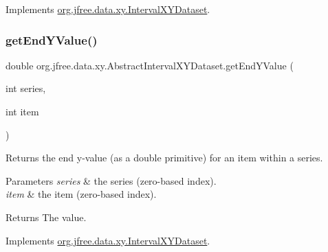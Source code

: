 Implements \mbox{\hyperlink{interfaceorg_1_1jfree_1_1data_1_1xy_1_1_interval_x_y_dataset_ad976e66caa1fc4d72a599f2c26c55dcc}{org.\+jfree.\+data.\+xy.\+Interval\+X\+Y\+Dataset}}.

\mbox{\label{classorg_1_1jfree_1_1data_1_1xy_1_1_abstract_interval_x_y_dataset_a31d20f77610d2b39a1401a48e06181c1}} 
\subsubsection{\texorpdfstring{get\+End\+Y\+Value()}{getEndYValue()}}
{\footnotesize\ttfamily double org.\+jfree.\+data.\+xy.\+Abstract\+Interval\+X\+Y\+Dataset.\+get\+End\+Y\+Value (\begin{DoxyParamCaption}\item[{int}]{series,  }\item[{int}]{item }\end{DoxyParamCaption})}

Returns the end y-\/value (as a double primitive) for an item within a series.


\begin{DoxyParams}{Parameters}
{\em series} & the series (zero-\/based index). \\
\hline
{\em item} & the item (zero-\/based index).\\
\hline
\end{DoxyParams}
\begin{DoxyReturn}{Returns}
The value. 
\end{DoxyReturn}


Implements \mbox{\hyperlink{interfaceorg_1_1jfree_1_1data_1_1xy_1_1_interval_x_y_dataset_a0538ada774aad34ec95edbb84c1a82e1}{org.\+jfree.\+data.\+xy.\+Interval\+X\+Y\+Dataset}}.

\mbox{\label{classorg_1_1jfree_1_1data_1_1xy_1_1_abstract_interval_x_y_dataset_a17554a8ef17203f1c12cbeaed806d092}} 
